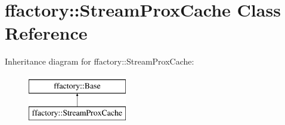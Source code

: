 \hypertarget{classffactory_1_1_stream_prox_cache}{\section{ffactory\-:\-:Stream\-Prox\-Cache Class Reference}
\label{classffactory_1_1_stream_prox_cache}
}
Inheritance diagram for ffactory\-:\-:Stream\-Prox\-Cache\-:\begin{figure}[H]
\begin{center}
\leavevmode
\includegraphics[height=2.000000cm]{classffactory_1_1_stream_prox_cache}
\end{center}
\end{figure}
